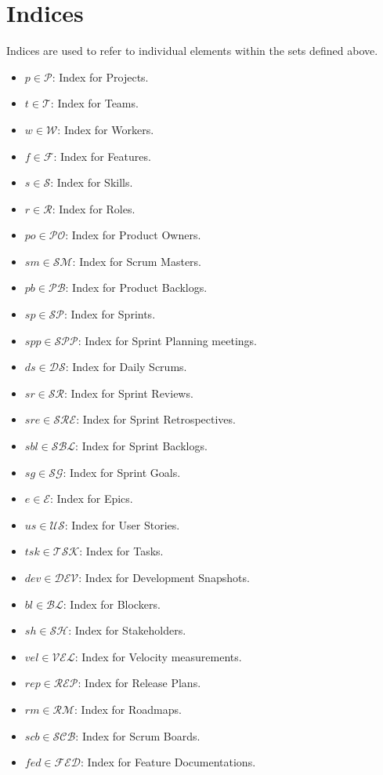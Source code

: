 \documentclass[11pt]{article}
\begin{document}
\section{Indices}
Indices are used to refer to individual elements within the sets defined above.

\begin{itemize}
    \item $p \in \mathcal{P}$: Index for Projects.
    \item $t \in \mathcal{T}$: Index for Teams.
    \item $w \in \mathcal{W}$: Index for Workers.
    \item $f \in \mathcal{F}$: Index for Features.
    \item $s \in \mathcal{S}$: Index for Skills.
    \item $r \in \mathcal{R}$: Index for Roles.
    \item $po \in \mathcal{PO}$: Index for Product Owners.
    \item $sm \in \mathcal{SM}$: Index for Scrum Masters.
    \item $pb \in \mathcal{PB}$: Index for Product Backlogs.
    \item $sp \in \mathcal{SP}$: Index for Sprints.
    \item $spp \in \mathcal{SPP}$: Index for Sprint Planning meetings.
    \item $ds \in \mathcal{DS}$: Index for Daily Scrums.
    \item $sr \in \mathcal{SR}$: Index for Sprint Reviews.
    \item $sre \in \mathcal{SRE}$: Index for Sprint Retrospectives.
    \item $sbl \in \mathcal{SBL}$: Index for Sprint Backlogs.
    \item $sg \in \mathcal{SG}$: Index for Sprint Goals.
    \item $e \in \mathcal{E}$: Index for Epics.
    \item $us \in \mathcal{US}$: Index for User Stories.
    \item $tsk \in \mathcal{TSK}$: Index for Tasks.
    \item $dev \in \mathcal{DEV}$: Index for Development Snapshots.
    \item $bl \in \mathcal{BL}$: Index for Blockers.
    \item $sh \in \mathcal{SH}$: Index for Stakeholders.
    \item $vel \in \mathcal{VEL}$: Index for Velocity measurements.
    \item $rep \in \mathcal{REP}$: Index for Release Plans.
    \item $rm \in \mathcal{RM}$: Index for Roadmaps.
    \item $scb \in \mathcal{SCB}$: Index for Scrum Boards.
    \item $fed \in \mathcal{FED}$: Index for Feature Documentations.
\end{itemize}
\end{document}
